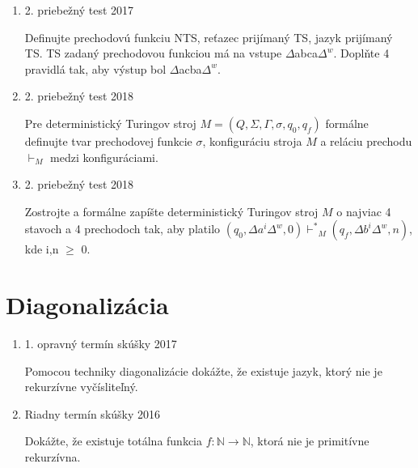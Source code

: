 \documentclass[]{article}
\begin{document}
	\begin{enumerate}
		\item 2. priebežný test 2017
		
		Definujte prechodovú funkciu NTS, reťazec prijímaný TS, jazyk prijímaný TS. TS zadaný prechodovou funkciou má na vstupe $\Delta$abca$\Delta^{w}$. Doplňte 4 pravidlá tak, aby výstup bol $\Delta$acba$\Delta^w$.
		
		\item 2. priebežný test 2018
		
		Pre deterministický Turingov stroj $M = (Q, \Sigma, \Gamma, \sigma, q_0, q_f)$ formálne definujte tvar prechodovej funkcie $\sigma$, konfiguráciu stroja $M$ a reláciu prechodu $\vdash_M$ medzi konfiguráciami.
		
		\item 2. priebežný test 2018
		
		Zostrojte a formálne zapíšte deterministický Turingov stroj $M$ o najviac 4 stavoch a 4 prechodoch tak, aby platilo $(q_0, \Delta a^i\Delta^w, 0) {\vdash^*}_M (q_f, \Delta b^i\Delta^w, n)$, kde i,n $\geq$ 0.
	\end{enumerate}

	
	\section{Diagonalizácia}
	
	\begin{enumerate}
		\item 1. opravný termín skúšky 2017
		
		Pomocou techniky diagonalizácie dokážte, že existuje jazyk, ktorý nie je rekurzívne vyčísliteľný.
		\item Riadny termín skúšky 2016
		
		Dokážte, že existuje totálna funkcia $f: \mathbb{N} \rightarrow \mathbb{N}$, ktorá nie je primitívne rekurzívna.
		
	\end{enumerate}
	
\end{document}
